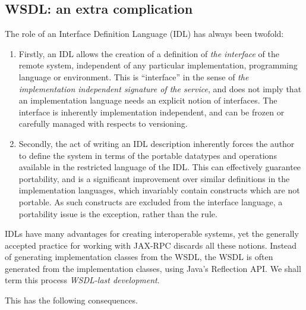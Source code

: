 \subsection{WSDL: an extra complication}
\label{objections:wsdl-gen}

The role of an Interface Definition Language (IDL) has always been
twofold:

\begin{enumerate}
\item Firstly, an IDL allows the creation of a definition of \emph{the
interface} of the remote system, independent of any particular
implementation, programming language or environment. This is
``interface'' in the sense of \emph{the implementation independent
signature of the service}, and does not imply that an implementation
language needs an explicit notion of interfaces. The interface is
inherently implementation independent, and can be frozen or carefully
managed with respects to versioning.

\item Secondly, the act of writing an IDL description inherently
forces the author to define the system in terms of the portable
datatypes and operations available in the restricted language of the
IDL.  This can effectively guarantee portability, and is a significant
improvement over similar definitions in the implementation languages,
which invariably contain constructs which are not portable. As such
constructs are excluded from the interface language, a portability
issue is the exception, rather than the rule.
\end{enumerate}

IDLs have many advantages for creating interoperable systems, yet the
generally accepted practice for working with JAX-RPC discards all
these notions. Instead of generating implementation classes from the
WSDL, the WSDL is often generated from the implementation classes,
using Java's Reflection API. We shall term this process
\emph{WSDL-last development}.

This has the following consequences.


